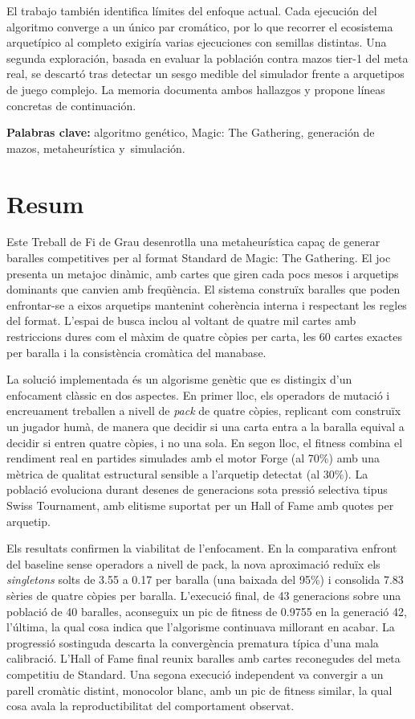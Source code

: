 El trabajo también identifica límites del enfoque actual. Cada ejecución del algoritmo converge a un único par cromático, por lo que recorrer el ecosistema arquetípico al completo exigiría varias ejecuciones con semillas distintas. Una segunda exploración, basada en evaluar la población contra mazos tier-1 del meta real, se descartó tras detectar un sesgo medible del simulador frente a arquetipos de juego complejo. La memoria documenta ambos hallazgos y propone líneas concretas de continuación.

\textbf{Palabras clave:} algoritmo genético, Magic: The Gathering, generación de mazos, metaheurística y~simulación.

\chapter*{Resum}

Este Treball de Fi de Grau desenrotlla una metaheurística capaç de generar baralles competitives per al format Standard de Magic: The Gathering. El joc presenta un metajoc dinàmic, amb cartes que giren cada pocs mesos i arquetips dominants que canvien amb freqüència. El sistema construïx baralles que poden enfrontar-se a eixos arquetips mantenint coherència interna i respectant les regles del format. L'espai de busca inclou al voltant de quatre mil cartes amb restriccions dures com el màxim de quatre còpies per carta, les 60 cartes exactes per baralla i la consistència cromàtica del manabase.

La solució implementada és un algorisme genètic que es distingix d'un enfocament clàssic en dos aspectes. En primer lloc, els operadors de mutació i encreuament treballen a nivell de \emph{pack} de quatre còpies, replicant com construïx un jugador humà, de manera que decidir si una carta entra a la baralla equival a decidir si entren quatre còpies, i no una sola. En segon lloc, el fitness combina el rendiment real en partides simulades amb el motor Forge (al 70\%) amb una mètrica de qualitat estructural sensible a l'arquetip detectat (al 30\%). La població evoluciona durant desenes de generacions sota pressió selectiva tipus Swiss Tournament, amb elitisme suportat per un Hall of Fame amb quotes per arquetip.

Els resultats confirmen la viabilitat de l'enfocament. En la comparativa enfront del baseline sense operadors a nivell de pack, la nova aproximació reduïx els \emph{singletons} solts de 3.55 a 0.17 per baralla (una baixada del 95\%) i consolida 7.83 sèries de quatre còpies per baralla. L'execució final, de 43 generacions sobre una població de 40 baralles, aconseguix un pic de fitness de 0.9755 en la generació 42, l'última, la qual cosa indica que l'algorisme continuava millorant en acabar. La progressió sostinguda descarta la convergència prematura típica d'una mala calibració. L'Hall of Fame final reunix baralles amb cartes reconegudes del meta competitiu de Standard. Una segona execució independent va convergir a un parell cromàtic distint, monocolor blanc, amb un pic de fitness similar, la qual cosa avala la reproductibilitat del comportament observat.

